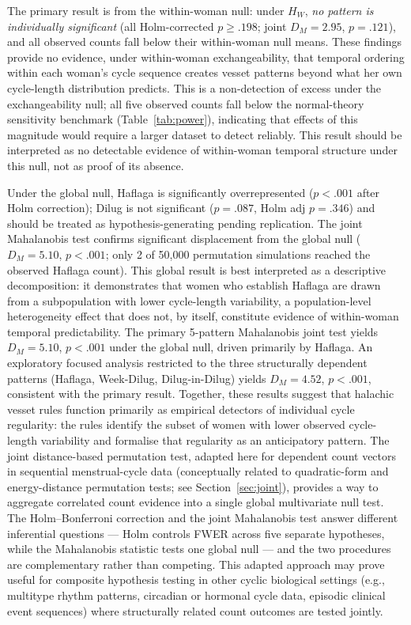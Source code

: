 \documentclass[12pt]{article}
\begin{document}
The primary result is from the within-woman null: under $H_W$, \emph{no pattern is
individually significant} (all Holm-corrected $p \geq .198$; joint $D_M = 2.95$, $p = .121$), and
all observed counts fall below their within-woman null means. These findings provide no evidence, under within-woman exchangeability, that
temporal ordering within each woman's cycle sequence creates vesset patterns
beyond what her own cycle-length distribution predicts. This is a non-detection of excess under the exchangeability null; all five observed counts fall below the normal-theory sensitivity benchmark (Table~\ref{tab:power}), indicating that effects of this magnitude would require a larger dataset to detect reliably. This result should be interpreted as no detectable evidence of within-woman temporal structure under this null, not as proof of its absence.

Under the global null, Haflaga is significantly overrepresented ($p < .001$ after
Holm correction); Dilug is not significant ($p = .087$, Holm adj $p = .346$) and should be treated as hypothesis-generating pending
replication. The joint Mahalanobis test confirms significant displacement from the
global null ($D_M = 5.10$, $p < .001$; only 2 of 50,000 permutation simulations
reached the observed Haflaga count). This global result is best interpreted as a
descriptive decomposition: it demonstrates that women who establish Haflaga are
drawn from a subpopulation with lower cycle-length variability, a population-level
heterogeneity effect that does not, by itself, constitute evidence of within-woman
temporal predictability. The primary 5-pattern Mahalanobis joint test yields $D_M = 5.10$, $p < .001$
under the global null, driven primarily by Haflaga. An exploratory focused analysis
restricted to the three structurally dependent patterns (Haflaga, Week-Dilug,
Dilug-in-Dilug) yields $D_M = 4.52$, $p < .001$, consistent with the primary result. Together, these results suggest that halachic vesset rules function
primarily as empirical detectors of individual cycle regularity: the rules identify
the subset of women with lower observed cycle-length variability and formalise that
regularity as an anticipatory pattern. The joint distance-based permutation test, adapted here for dependent count vectors
in sequential menstrual-cycle data (conceptually related to quadratic-form and
energy-distance permutation tests; see Section~\ref{sec:joint}), provides a way to
aggregate correlated count evidence into a single global multivariate null test.
The Holm--Bonferroni correction and the joint Mahalanobis test answer different
inferential questions --- Holm controls FWER across five separate hypotheses, while
the Mahalanobis statistic tests one global null --- and the two procedures are
complementary rather than competing. This adapted approach may prove useful for
composite hypothesis testing in other cyclic biological settings (e.g., multitype
rhythm patterns, circadian or hormonal cycle data, episodic clinical event sequences)
where structurally related count outcomes are tested jointly.
\end{document}
